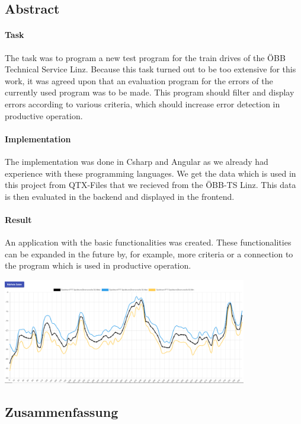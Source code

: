 \begin{spacing}{1}
    \chapter*{Abstract}
\end{spacing}
\subsubsection{Task}
The task was to program a new test program for the train drives of the ÖBB Technical Service Linz. Because this task
turned out to be too extensive for this work, it was agreed upon that an evaluation program for the errors of the currently
used program was to be made. This program should filter and display errors according to various criteria, which should 
increase error detection in productive operation.
\subsubsection{Implementation}
The implementation was done in Csharp and Angular as we already had experience with these programming languages. 
We get the data which is used in this project from QTX-Files that we recieved from the ÖBB-TS Linz.
This data is then evaluated in the backend and displayed in the frontend.
\subsubsection{Result}
An application with the basic functionalities was created. These functionalities can be expanded in the future by, 
for example, more criteria or a connection to the program which is used in productive operation.
\begin{center}
  \includegraphics[width=0.8\textwidth]{pics/graphwok.PNG}
\end{center}
\newpage
\begin{spacing}{1}
    \chapter*{Zusammenfassung}
\end{spacing}
